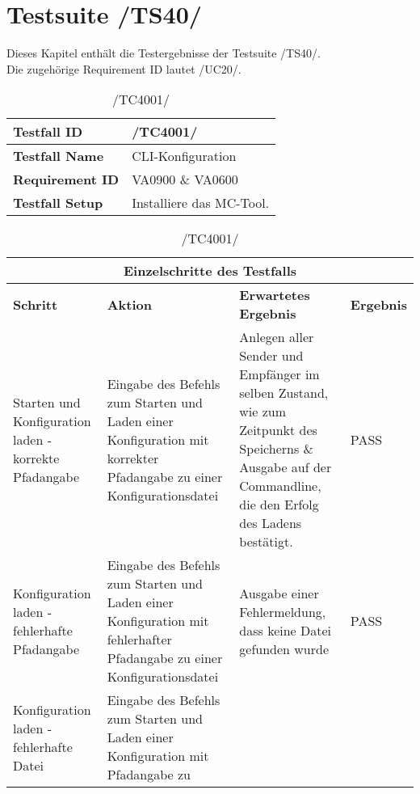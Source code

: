 \chapter{Testsuite /TS40/}
Dieses Kapitel enthält die Testergebnisse der Testsuite /TS40/.\\
Die zugehörige Requirement ID lautet /UC20/.

\begin{table}[h]
    \caption{/TC4001/}
    \label{tab:TC4001}
    \begin{center}
        \begin{tabular}{|p{3.5cm}|p{11cm}|}
            \hline
                \textbf{Testfall ID} & /TC4001/\\
            \hline
                \textbf{Testfall Name} & CLI-Konfiguration\\
            \hline
                \textbf{Requirement ID} & VA0900 \& VA0600\\
            \hline
                \textbf{Testfall Setup} & Installiere das MC-Tool.\\
            \hline
        \end{tabular}
        \begin{tabular}{|p{2cm}|p{3.9cm}|p{3.9cm}|p{3.8cm}|}
            \multicolumn{4}{|c|}{\textbf{Einzelschritte des Testfalls}} \\
            \hline
                \textbf{Schritt} & \textbf{Aktion} & \textbf{Erwartetes
                Ergebnis} & \textbf{Ergebnis}\\
            \hline
                Starten und Konfiguration laden - korrekte Pfadangabe & Eingabe
                des Befehls zum Starten und Laden einer Konfiguration mit
                korrekter Pfadangabe zu einer Konfigurationsdatei & Anlegen
                aller Sender und Empfänger im selben Zustand, wie zum Zeitpunkt
                des Speicherns \& Ausgabe auf der Commandline, die den Erfolg
                des Ladens bestätigt. & PASS \\
            \hline
                Konfiguration laden - fehlerhafte Pfadangabe & Eingabe des
                Befehls zum Starten und Laden einer Konfiguration mit
                fehlerhafter Pfadangabe zu einer Konfigurationsdatei & Ausgabe
                einer Fehlermeldung, dass keine Datei gefunden wurde &
                PASS \\
            \hline
                Konfiguration laden - fehlerhafte Datei & Eingabe des Befehls
                zum Starten und Laden einer Konfiguration mit Pfadangabe zu

\end{tabular}
\end{center}
\end{table}
